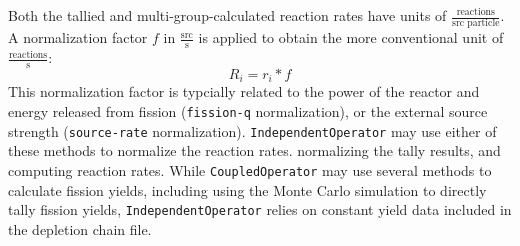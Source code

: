         Both the tallied and multi-group-calculated reaction rates have units of
        $\frac{\text{reactions}}{\text{src particle}}$. A normalization factor
        $f$ in $\frac{\text{src}}{\text{s}}$ is applied to obtain the more
        conventional unit of $\frac{\text{reactions}}{\text{s}}$:
        \begin{equation}
            R_i = r_i * f
        \end{equation}
        This normalization factor is typcially related to the power of the
        reactor and energy released from fission (\verb.fission-q.
        normalization), or the external source strength (\verb.source-rate.
        normalization). \verb.IndependentOperator. may use either of these methods to normalize
        the reaction rates. normalizing the tally results, and computing
        reaction rates. While \verb.CoupledOperator. may use several methods to
        calculate fission yields, including using the Monte Carlo simulation to
        directly tally fission yields, \verb.IndependentOperator. relies on
        constant yield data included in the depletion chain file.
